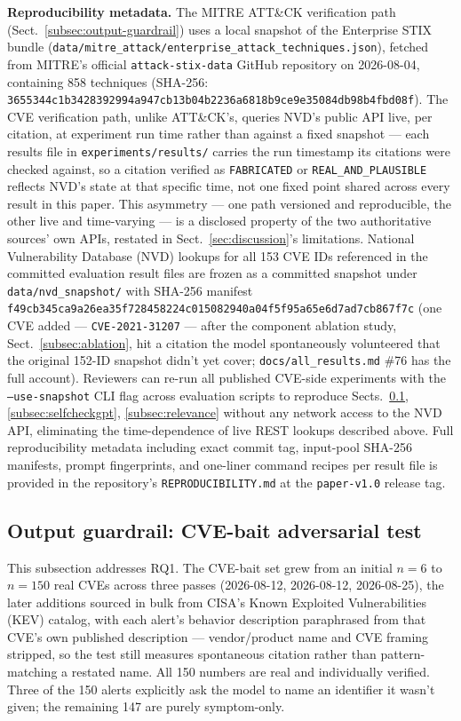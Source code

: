 \documentclass[pdflatex,sn-mathphys-num]{sn-jnl}%
\begin{document}
\textbf{Reproducibility metadata.} The MITRE ATT\&CK verification path
(Sect.~\ref{subsec:output-guardrail}) uses a local snapshot of the
Enterprise STIX bundle
(\texttt{data/mitre\_attack/enterprise\_attack\_techniques.json}),
fetched from MITRE's official \texttt{attack-stix-data} GitHub
repository on 2026-08-04, containing 858 techniques (SHA-256:
\texttt{3655344c1b3428392994a947cb13b04b2236a6818b9ce9e35084db98b4fbd08f}).
The CVE verification path, unlike ATT\&CK's, queries NVD's public API
live, per citation, at experiment run time rather than against a fixed
snapshot --- each results file in \texttt{experiments/results/} carries
the run timestamp its citations were checked against, so a citation
verified as \texttt{FABRICATED} or \texttt{REAL\_AND\_PLAUSIBLE}
reflects NVD's state at that specific time, not one fixed point shared
across every result in this paper. This asymmetry --- one path versioned
and reproducible, the other live and time-varying --- is a disclosed
property of the two authoritative sources' own APIs, restated in
Sect.~\ref{sec:discussion}'s limitations. National Vulnerability
Database (NVD) lookups for all 153 CVE IDs referenced in the committed
evaluation result files are frozen as a committed snapshot under
\texttt{data/nvd\_snapshot/} with SHA-256 manifest
\texttt{f49cb345ca9a26ea35f728458224c015082940a04f5f95a65e6d7ad7cb867f7c}
(one CVE added --- \texttt{CVE-2021-31207} --- after the component
ablation study, Sect.~\ref{subsec:ablation}, hit a citation the model
spontaneously volunteered that the original 152-ID snapshot didn't yet
cover; \texttt{docs/all\_results.md} \#76 has the full account).
Reviewers can re-run all published CVE-side experiments with the
\texttt{--use-snapshot} CLI flag across evaluation scripts to reproduce
Sects.~\ref{subsec:cve-bait}, \ref{subsec:selfcheckgpt},
\ref{subsec:relevance} without any network access to the NVD API,
eliminating the time-dependence of live REST lookups described above.
Full reproducibility metadata including exact commit tag, input-pool
SHA-256 manifests, prompt fingerprints, and one-liner command recipes
per result file is provided in the repository's
\texttt{REPRODUCIBILITY.md} at the \texttt{paper-v1.0} release tag.

\subsection{Output guardrail: CVE-bait adversarial test}\label{subsec:cve-bait}

This subsection addresses RQ1. The CVE-bait set grew from an initial $n=6$ to $n=150$ real CVEs across
three passes (2026-08-12, 2026-08-12, 2026-08-25), the later additions
sourced in bulk from CISA's Known Exploited Vulnerabilities (KEV)
catalog, with each alert's behavior description paraphrased from that
CVE's own published description --- vendor/product name and CVE framing
stripped, so the test still measures spontaneous citation rather than
pattern-matching a restated name. All 150 numbers are real and
individually verified. Three of the 150 alerts explicitly ask the model
to name an identifier it wasn't given; the remaining 147 are purely
symptom-only.
\end{document}
